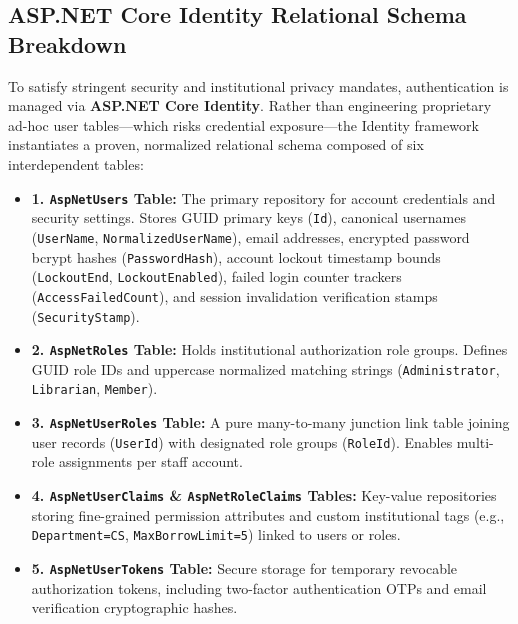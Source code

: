 \documentclass[10pt,journal,compsoc]{IEEEtran}
\begin{document}
\subsection{ASP.NET Core Identity Relational Schema Breakdown}
To satisfy stringent security and institutional privacy mandates, authentication is managed via \textbf{ASP.NET Core Identity}. Rather than engineering proprietary ad-hoc user tables---which risks credential exposure---the Identity framework instantiates a proven, normalized relational schema composed of six interdependent tables:
\begin{itemize}[leftmargin=1.5em]
    \item \textbf{1. \texttt{AspNetUsers} Table:} The primary repository for account credentials and security settings. Stores GUID primary keys (\texttt{Id}), canonical usernames (\texttt{UserName}, \texttt{NormalizedUserName}), email addresses, encrypted password bcrypt hashes (\texttt{PasswordHash}), account lockout timestamp bounds (\texttt{LockoutEnd}, \texttt{LockoutEnabled}), failed login counter trackers (\texttt{AccessFailedCount}), and session invalidation verification stamps (\texttt{SecurityStamp}).
    \item \textbf{2. \texttt{AspNetRoles} Table:} Holds institutional authorization role groups. Defines GUID role IDs and uppercase normalized matching strings (\texttt{Administrator}, \texttt{Librarian}, \texttt{Member}).
    \item \textbf{3. \texttt{AspNetUserRoles} Table:} A pure many-to-many junction link table joining user records (\texttt{UserId}) with designated role groups (\texttt{RoleId}). Enables multi-role assignments per staff account.
    \item \textbf{4. \texttt{AspNetUserClaims} \& \texttt{AspNetRoleClaims} Tables:} Key-value repositories storing fine-grained permission attributes and custom institutional tags (e.g., \texttt{Department=CS}, \texttt{MaxBorrowLimit=5}) linked to users or roles.
    \item \textbf{5. \texttt{AspNetUserTokens} Table:} Secure storage for temporary revocable authorization tokens, including two-factor authentication OTPs and email verification cryptographic hashes.
\end{itemize}
\end{document}
